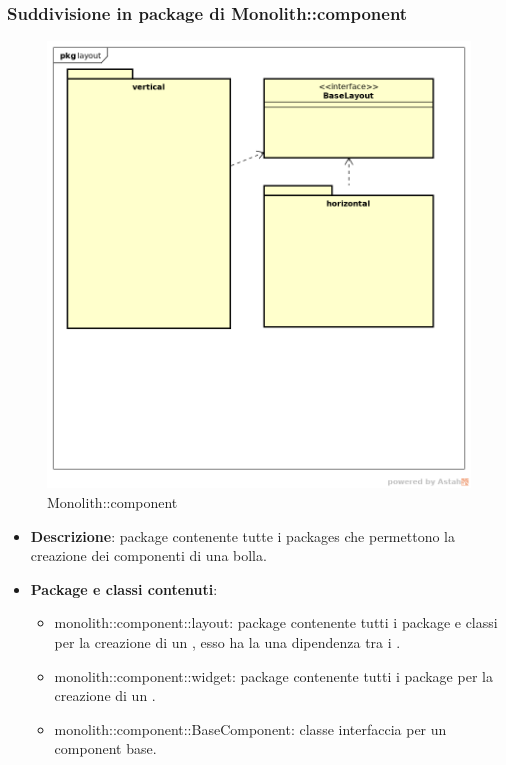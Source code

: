 \subsubsection{Suddivisione in package  di Monolith::component}
\label{Monolith::component}
\begin{figure}[H]
	\centering
	\includegraphics[scale=0.5]{Sezioni/imgPackage/component.png}
	\caption{Monolith::component}
\end{figure}
\begin{itemize}
	\item{\textbf{Descrizione}}: package contenente tutte i packages che permettono la creazione dei componenti di una bolla.
	\item{\textbf{Package e classi contenuti}}:
	\begin{itemize}
	\item{monolith::component::layout}: package contenente tutti i package e classi per la creazione di un , esso ha la una dipendenza tra i .
	\item{monolith::component::widget}: package contenente tutti i package per la creazione di un .
	\item{monolith::component::BaseComponent}: classe interfaccia per un component base.
	\end{itemize}
	
\end{itemize}

